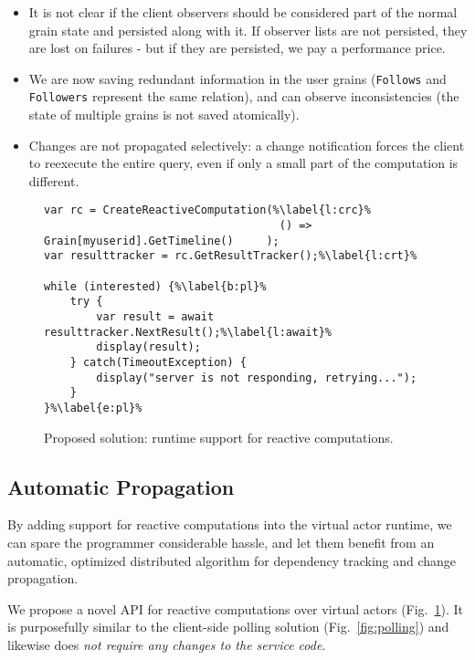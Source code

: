 \hidden
{\begin{itemize}
\item It is not clear if the client observers should be considered part of the normal grain state and persisted along with it. If observer lists are not persisted, they are lost on failures - but if they are persisted, we pay a performance price.
\item We are now saving redundant information in the user grains (\lstinline{Follows} and \lstinline{Followers} represent the same relation), and can observe inconsistencies  (the state of multiple grains is not saved atomically).  
\item Changes are not propagated selectively: a change notification forces the client to reexecute the entire query, even if only a small part of the computation is different.
\end{itemize}
}



\begin{figure}
\begin{lstlisting}
var rc = CreateReactiveComputation(%\label{l:crc}%
									() => Grain[myuserid].GetTimeline()   	);
var resulttracker = rc.GetResultTracker();%\label{l:crt}%

while (interested) {%\label{b:pl}%
	try {
		var result = await resulttracker.NextResult();%\label{l:await}%
		display(result);
	} catch(TimeoutException) { 
		display("server is not responding, retrying...");
	}
}%\label{e:pl}%
\end{lstlisting}
\caption{Proposed solution: runtime support for reactive computations.}\label{fig:rcapi}
\end{figure}


\subsection{Automatic Propagation}\label{sec:reactive}

By adding support for reactive computations into the virtual actor runtime, we can spare the programmer considerable hassle, and let them benefit from an automatic, optimized distributed algorithm for dependency tracking and change propagation. 

We propose a novel API for reactive computations over virtual actors (Fig.~\ref{fig:rcapi}). It is purposefully similar to the client-side polling solution (Fig.~\ref{fig:polling}) and likewise does \emph{not require any changes to the service code}. 

